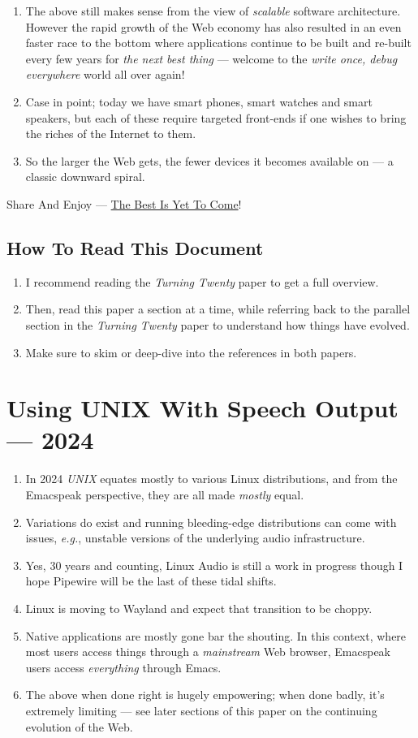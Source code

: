 \documentclass[11pt]{article}
\begin{document}
\begin{enumerate}
\item The above still makes sense from the view of  \emph{scalable} software architecture. However the rapid growth of the Web economy has also
resulted in an even faster race to the bottom where applications
continue to be built and re-built every few years for \emph{the next
best thing} --- welcome to the \emph{write once, debug everywhere}
world all over again!
\item Case in point; today we have smart phones, smart watches  and smart speakers,
but each of these  require targeted front-ends  
if one wishes to  bring the riches of the Internet to them.
\item So the larger the Web gets, the fewer devices it becomes
available  on --- a classic downward spiral.
\end{enumerate}

Share And Enjoy --- \href{https://tvraman.github.io/emacspeak/web/01-gemini.ogg}{The Best Is Yet To Come}!
\subsection{How To Read This Document}
\label{sec:orgbe57faf}

\begin{enumerate}
\item I recommend reading the \emph{Turning Twenty} paper to get a full overview.
\item Then, read this paper a section at a time, while referring back to
the parallel section in the \emph{Turning Twenty} paper to understand
how things have evolved.
\item Make sure to skim or deep-dive into the references in both papers.
\end{enumerate}
\section{Using UNIX With Speech Output —  2024}
\label{sec:orgea75d7b}

\begin{enumerate}
\item In 2024 \emph{UNIX} equates mostly to various Linux distributions, and from
the Emacspeak perspective, they are all made \emph{mostly} equal.
\item Variations do exist and  running bleeding-edge distributions can come
with issues, \emph{e.g.}, unstable versions of the underlying audio infrastructure.
\item Yes, 30 years and counting, Linux Audio is still a work in
progress though I hope Pipewire will be the last of these tidal shifts.
\item Linux is moving to Wayland  and expect that transition to
be choppy.
\item Native applications are mostly gone bar
the shouting. In this context, where most users access things
through a \emph{mainstream} Web browser, Emacspeak users access
\emph{everything} through Emacs.
\item The above when  done right is hugely empowering; 
 when done badly, it's extremely limiting  --- see later
sections of this paper on  the continuing evolution of the Web.
\end{enumerate}
\end{document}
